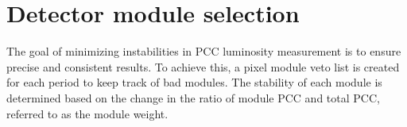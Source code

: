 \section{Detector module selection}

The goal of minimizing instabilities in PCC luminosity measurement is to ensure precise and consistent results. To achieve this, a pixel module veto list is created for each period to keep track of  bad modules. The stability of each module is determined based on the change in the ratio of module PCC and total PCC, referred to as the module weight. %






